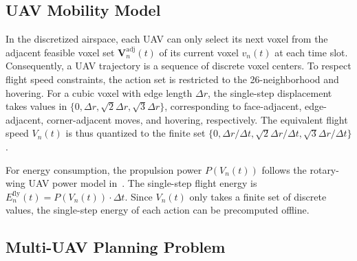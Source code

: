 \documentclass[lettersize,journal]{IEEEtran}
\begin{document}
\subsection{UAV Mobility Model}

In the discretized airspace, each UAV can only select its next voxel from the adjacent feasible voxel set $\mathbf{V}_n^{\mathrm{adj}}(t)$ of its current voxel $v_n(t)$ at each time slot. Consequently, a UAV trajectory is a sequence of discrete voxel centers. To respect flight speed constraints, the action set is restricted to the 26-neighborhood and hovering. For a cubic voxel with edge length $\Delta r$, the single-step displacement takes values in $\{0,\Delta r,\sqrt{2}\Delta r,\sqrt{3}\Delta r\}$, corresponding to face-adjacent, edge-adjacent, corner-adjacent moves, and hovering, respectively. The equivalent flight speed $V_n(t)$ is thus quantized to the finite set $\{0,\Delta r/\Delta t,\sqrt{2}\Delta r/\Delta t,\sqrt{3}\Delta r/\Delta t\}$.

For energy consumption, the propulsion power $P(V_n(t))$ follows the rotary-wing UAV power model in~\cite{ref17}. The single-step flight energy is $E_n^{\mathrm{fly}}(t)=P(V_n(t))\cdot\Delta t$. Since $V_n(t)$ only takes a finite set of discrete values, the single-step energy of each action can be precomputed offline.

\subsection{Multi-UAV Planning Problem}
\end{document}
